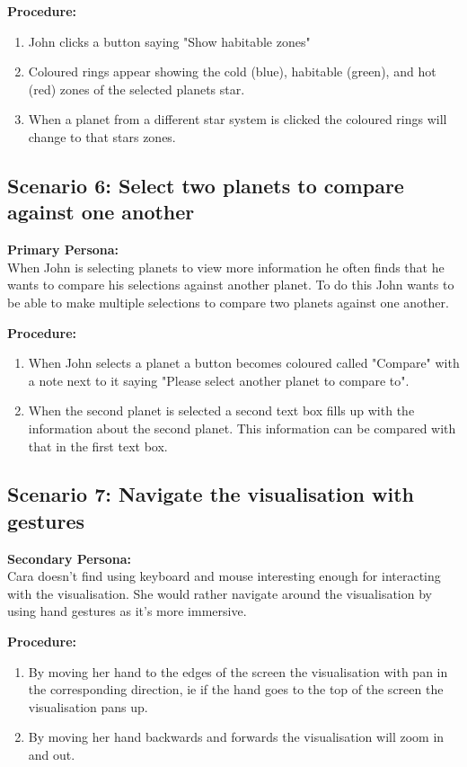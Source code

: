   {\bf  Procedure:}
   \begin{enumerate}
 \item John clicks a button saying "Show habitable zones"
 \item Coloured rings appear showing the cold (blue), habitable (green), and hot
(red) zones of the selected planets star.
 \item When a planet from a different star system is clicked the coloured rings
will change to that stars zones.
 \end{enumerate}
 \subsection{Scenario 6: Select two planets to compare against one another}
    {\bf  Primary Persona:}\\
When John is selecting planets to view more information he often finds that he wants to compare his selections against another planet. To do this John wants to be able to make multiple selections to compare two planets against one another.
  
  {\bf  Procedure:}
   \begin{enumerate}
 \item When John selects a planet a button becomes coloured called "Compare"
with a note next to it saying "Please select another planet to compare to".
 \item When the second planet is selected a second text box fills up with the
information about the second planet. This information can be compared with that
in the first text box.
  \end{enumerate}
  
 \subsection{Scenario 7: Navigate the visualisation with gestures}
    {\bf  Secondary Persona:}\\
Cara doesn't find using keyboard and mouse interesting enough for interacting with the visualisation. She would rather navigate around the visualisation by using hand
gestures as it's more immersive.

  {\bf  Procedure:}
   \begin{enumerate}
 \item By moving her hand to the edges of the screen the visualisation with pan
in the corresponding direction, ie if the hand goes to the top of the screen
the visualisation pans up.
 \item By moving her hand backwards and forwards the visualisation will zoom in
and out.
  \end{enumerate}
